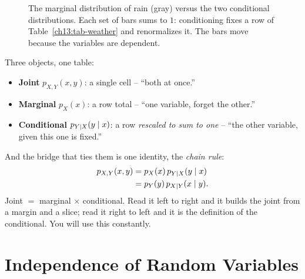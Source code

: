 \begin{figure}[H]
\centering
{}
\caption{The marginal distribution of rain (gray) versus the two conditional
distributions. Each set of bars sums to $1$: conditioning fixes a row of
Table~\ref{ch13:tab-weather} and renormalizes it. The bars move because the
variables are dependent.}
\label{ch13:fig-condbars}
\end{figure}

\begin{focusbox}
Three objects, one table:
\begin{itemize}
  \item \textbf{Joint} $p_{X,Y}(x,y)$: a single cell -- ``both at once.''
  \item \textbf{Marginal} $p_X(x)$: a row total -- ``one variable, forget the
        other.''
  \item \textbf{Conditional} $p_{Y\mid X}(y\mid x)$: a row \emph{rescaled to
        sum to one} -- ``the other variable, given this one is fixed.''
\end{itemize}
And the bridge that ties them is one identity, the \emph{chain rule}:
\begin{align*}
  p_{X,Y}(x,y) &= p_X(x)\, p_{Y\mid X}(y\mid x) \\
              &= p_Y(y)\, p_{X\mid Y}(x\mid y).
\end{align*}
Joint $=$ marginal $\times$ conditional. Read it left to right and it builds the
joint from a margin and a slice; read it right to left and it is the definition of
the conditional. You will use this constantly.
\end{focusbox}

\section{Independence of Random Variables}
\label{ch13:independence}

